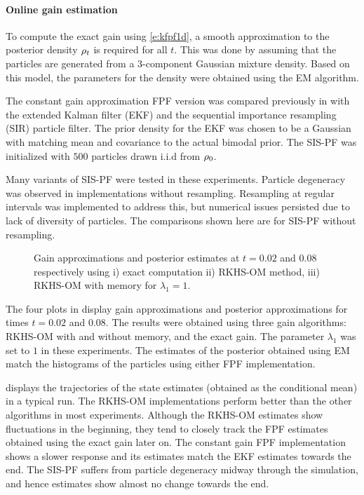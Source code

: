 \paragraph*{Online gain estimation}
To compute the exact gain using \eqref{e:kfpf1d}, a smooth approximation to the posterior density $\rho_t$ is required for all $t$. This was done by assuming that the particles are generated from a  3-component Gaussian mixture density. Based on this model, the parameters for the density were obtained using the EM algorithm.

The constant gain approximation FPF  version was compared previously in \cite{tilghiomeh13} with the extended Kalman filter (EKF) and the  sequential importance resampling (SIR) particle filter. The prior density for the EKF was chosen to be a Gaussian with matching mean and covariance to the actual bimodal prior. The SIS-PF was   initialized with $500$ particles drawn i.i.d from $\rho_0$.

Many variants of SIS-PF were tested in these experiments.
Particle degeneracy was observed in implementations without resampling.
Resampling at regular intervals was implemented to address this, but
numerical issues persisted due to lack   of diversity of particles. The comparisons
shown
here are for SIS-PF without resampling.

\begin{figure}[h]
	\caption{ Gain approximations and posterior estimates at $t=0.02$ and $0.08$ respectively using i) exact computation ii) RKHS-OM method, iii) RKHS-OM with memory for $\lambda_1=1$.}
	\label{fig:gain_hist_028}
\end{figure}

The four plots in   display  gain approximations and posterior approximations for times $t = 0.02$ and $0.08$.   The results were  obtained using three gain algorithms:  RKHS-OM with and without memory, and  the exact gain.  The parameter
$\lambda_1$ was set to $1$ in these experiments. The estimates of the posterior obtained using EM match the histograms of the particles using either FPF implementation.

 displays the trajectories of the state estimates (obtained as the conditional mean) in a typical run.  The RKHS-OM implementations perform better than the other algorithms in most experiments. Although the RKHS-OM estimates show fluctuations in the beginning, they tend to closely track the FPF estimates obtained using the exact gain later on. The constant gain FPF implementation shows a slower response and its estimates match the EKF estimates towards the end. The SIS-PF suffers from particle degeneracy midway through the simulation, and hence estimates show almost no change towards the end.



